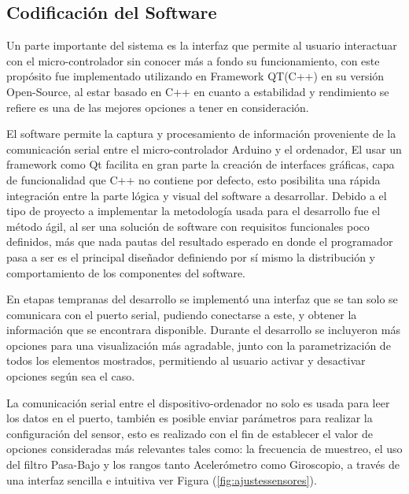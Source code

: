 \documentclass[12pt,a4paper]{article}
\begin{document}
\newpage
\subsection{Codificación del Software}
Un parte importante del sistema es la interfaz que permite al usuario interactuar con el micro-controlador sin conocer más a fondo su funcionamiento,
con este propósito fue implementado utilizando en Framework QT(C++)\cite{QT} en su versión Open-Source, al estar basado en C++ en cuanto a estabilidad y rendimiento se refiere es una de las mejores opciones a tener en consideración.

El software permite la captura y procesamiento de información proveniente de la comunicación serial entre el micro-controlador Arduino y el ordenador,
El usar un framework como Qt facilita en gran parte la creación de interfaces gráficas, capa de funcionalidad que C++ no contiene por defecto, esto posibilita una rápida integración entre la parte lógica y visual del software a desarrollar.
Debido a el tipo de proyecto a implementar la metodología usada para el desarrollo fue el método ágil, al ser una solución de software con requisitos funcionales poco definidos, más que nada pautas del resultado esperado en donde el programador pasa a ser es el principal diseñador definiendo por sí mismo la distribución y comportamiento de los componentes del software.

En etapas tempranas del desarrollo se implementó una interfaz que se tan solo se comunicara con el puerto serial, pudiendo conectarse a este, y obtener la información que se encontrara disponible.
Durante el desarrollo se incluyeron más opciones para una visualización más agradable, junto con la parametrización de todos los elementos mostrados, permitiendo al usuario activar y desactivar opciones según sea el caso.

La comunicación serial entre el dispositivo-ordenador no solo es usada para leer los datos en el puerto, también es posible enviar parámetros para realizar la configuración del sensor, esto es realizado con el fin de establecer el valor de opciones consideradas más relevantes tales como: la frecuencia de muestreo, el uso del filtro Pasa-Bajo y los rangos tanto Acelerómetro como Giroscopio, a través de una interfaz sencilla e intuitiva ver Figura (\ref{fig:ajustessensores}).
\end{document}
